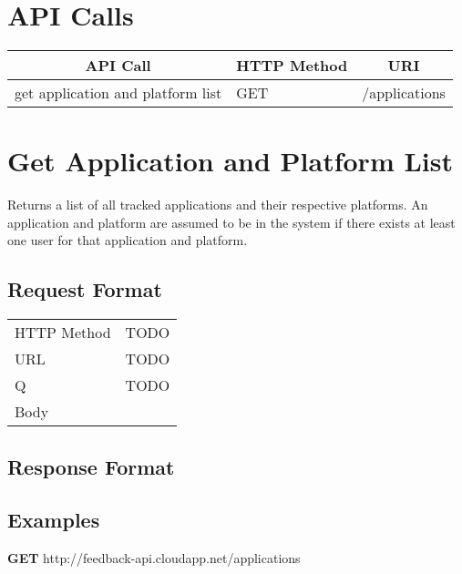 
\section{API Calls}
\begin{center}
\begin{tabular}{|l||l||l|}
\hline

\multicolumn{1}{|c||}{\textbf{API Call}} &
\multicolumn{1}{c||}{\textbf{HTTP Method}} &
\multicolumn{1}{c|}{\textbf{URI}} \\

\hline
\hline
get application and platform list  & GET & /applications \\
\hline
\end{tabular}
\end{center}

\section{Get Application and Platform List}

Returns a list of all tracked applications and their respective platforms.
An application and platform are assumed to be in the system if there exists
at least one user for that application and platform.

\subsection{Request Format}
\begin{center}
\begin{tabular}{|l||l|}
\hline
HTTP Method & TODO \\
URL & TODO \\
Q & TODO \\
Body \\
\hline
\end{tabular}
\end{center}


\subsection{Response Format}

\subsection{Examples}
\begin{center}
\textbf{GET} http://feedback-api.cloudapp.net/applications
\end{center}

